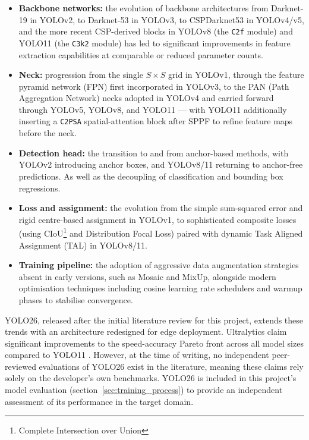 \begin{itemize}
	\item \textbf{Backbone networks:} the evolution of backbone architectures
	      from Darknet-19 in YOLOv2, to Darknet-53 in YOLOv3, to CSPDarknet53 in
	      YOLOv4/v5, and the more recent CSP-derived blocks in YOLOv8 (the
	      \texttt{C2f} module) and YOLO11 (the \texttt{C3k2} module) has led to
	      significant improvements in feature extraction capabilities at
	      comparable or reduced parameter counts.
	\item \textbf{Neck:} progression from the single $S\times S$ grid in
	      YOLOv1, through the feature pyramid network (FPN) first incorporated
	      in YOLOv3, to the PAN (Path Aggregation Network) necks adopted in
	      YOLOv4 and carried forward through YOLOv5, YOLOv8, and YOLO11 ---
	      with YOLO11 additionally inserting a \texttt{C2PSA} spatial-attention
	      block after SPPF to refine feature maps before the neck.
	\item \textbf{Detection head:} the transition to and from anchor-based
	      methods, with YOLOv2 introducing anchor boxes, and YOLOv8/11 returning
	      to anchor-free predictions. As well as the decoupling of classification
	      and bounding box regressions.
	\item \textbf{Loss and assignment:} the evolution from the simple
	      sum-squared error and rigid centre-based assignment in YOLOv1, to
	      sophisticated composite losses (using CIoU\footnote{Complete
		      Intersection over Union} and Distribution Focal Loss) paired with
	      dynamic Task Aligned Assignment (TAL) in YOLOv8/11.
	\item \textbf{Training pipeline:} the adoption of aggressive data
	      augmentation strategies absent in early versions, such as Mosaic and
	      MixUp, alongside modern optimisation techniques including cosine
	      learning rate schedulers and warmup phases to stabilise convergence.
\end{itemize}

YOLO26, released after the initial literature review for this project, extends
these trends with an architecture redesigned for edge deployment. Ultralytics
claim significant improvements to the speed-accuracy Pareto front across all
model sizes compared to YOLO11 \citep{jocher2025yolo26, vina2026yolo26}.
However, at the time of writing, no independent peer-reviewed evaluations of
YOLO26 exist in the literature, meaning these claims rely solely on the
developer's own benchmarks. YOLO26 is included in this project's model
evaluation (section~\ref{sec:training_process}) to provide an independent
assessment of its performance in the target domain.

